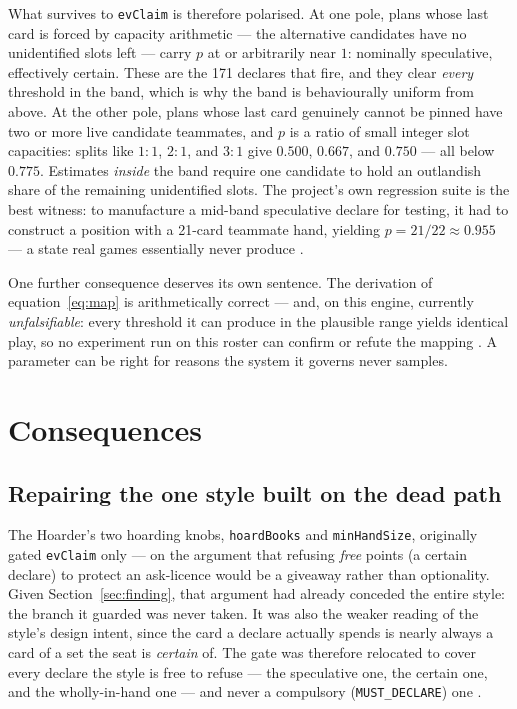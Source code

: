 \documentclass[11pt]{article}
\newcommand{\code}[1]{\texttt{#1}}
\begin{document}
What survives to \code{evClaim} is therefore polarised. At one pole, plans whose last card is
forced by capacity arithmetic --- the alternative candidates have no unidentified slots left ---
carry $p$ at or arbitrarily near $1$: nominally speculative, effectively certain. These are the
171 declares that fire, and they clear \emph{every} threshold in the band, which is why the band
is behaviourally uniform from above. At the other pole, plans whose last card genuinely cannot
be pinned have two or more live candidate teammates, and $p$ is a ratio of small integer slot
capacities: splits like $1{:}1$, $2{:}1$, and $3{:}1$ give $0.500$, $0.667$, and $0.750$ --- all
below $0.775$. Estimates \emph{inside} the band require one candidate to hold an outlandish
share of the remaining unidentified slots. The project's own regression suite is the best
witness: to manufacture a mid-band speculative declare for testing, it had to construct a
position with a 21-card teammate hand, yielding $p = 21/22 \approx 0.955$ --- a state real games
essentially never produce \cite{styletest}.

One further consequence deserves its own sentence. The derivation of
equation~\eqref{eq:map} is arithmetically correct --- and, on this engine, currently
\emph{unfalsifiable}: every threshold it can produce in the plausible range yields identical
play, so no experiment run on this roster can confirm or refute the mapping \cite{styles}. A
parameter can be right for reasons the system it governs never samples.

\section{Consequences}
\label{sec:consequences}

\subsection{Repairing the one style built on the dead path}
\label{sec:repair}

The Hoarder's two hoarding knobs, \code{hoardBooks} and \code{minHandSize}, originally gated
\code{evClaim} only --- on the argument that refusing \emph{free} points (a certain declare) to
protect an ask-licence would be a giveaway rather than optionality. Given
Section~\ref{sec:finding}, that argument had already conceded the entire style: the branch it
guarded was never taken. It was also the weaker reading of the style's design intent, since the
card a declare actually spends is nearly always a card of a set the seat is \emph{certain} of.
The gate was therefore relocated to cover every declare the style is free to refuse --- the
speculative one, the certain one, and the wholly-in-hand one --- and never a compulsory
(\code{MUST\_DECLARE}) one \cite{decide, styles}.
\end{document}

